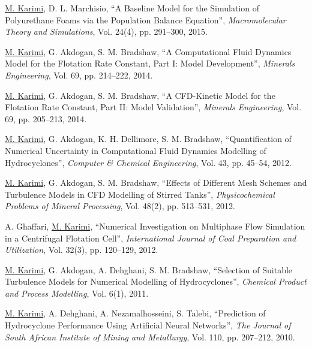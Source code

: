 \documentclass[10pt,a4]{article}
\newcounter{myEnumCounter}
\newcounter{mySaveCounter}
\renewenvironment{enumerate}{%
  \begin{list}{\arabic{myEnumCounter}.}{\usecounter{myEnumCounter}%
  \setcounter{myEnumCounter}{\value{mySaveCounter}}}
  }{%
  \setcounter{mySaveCounter}{\value{myEnumCounter}}\end{list}%
}
\newcommand{\quotes}[1]{``#1''}
\begin{document}
\begin{small}
\begin{enumerate}
	\item
\underline{M. Karimi}, D. L. Marchisio, \quotes{A Baseline Model for the Simulation of Polyurethane Foams via the Population Balance Equation}, \textit{Macromolecular Theory and Simulations}, Vol. 24(4), pp. 291--300, 2015.
	
	\item
\underline{M. Karimi}, G. Akdogan, S. M. Bradshaw, \quotes{A Computational Fluid Dynamics Model for the Flotation Rate Constant, Part I: Model Development}, \textit{Minerals Engineering}, Vol. 69, pp. 214--222, 2014.

	\item
\underline{M. Karimi}, G. Akdogan, S. M. Bradshaw, \quotes{A CFD-Kinetic Model for the Flotation Rate Constant, Part II: Model Validation}, \textit{Minerals Engineering}, Vol. 69, pp. 205--213, 2014.
	
	\item
\underline{M. Karimi}, G. Akdogan, K. H. Dellimore, S. M. Bradshaw, \quotes{Quantification of Numerical Uncertainty in Computational Fluid Dynamics Modelling of Hydrocyclones}, \textit{Computer \& Chemical Engineering}, Vol. 43, pp. 45--54, 2012. 

	\item 
\underline{M. Karimi}, G. Akdogan, S. M. Bradshaw, \quotes{Effects of Different Mesh Schemes and Turbulence Models in CFD Modelling of Stirred Tanks}, \textit{Physicochemical Problems of Mineral Processing}, Vol. 48(2), pp. 513--531, 2012.

	\item
A. Ghaffari, \underline{M. Karimi}, \quotes{Numerical Investigation on Multiphase Flow Simulation in a Centrifugal Flotation Cell}, \textit{International Journal of Coal Preparation and Utilization}, Vol. 32(3), pp. 120--129, 2012.

	\item 
\underline{M. Karimi}, G. Akdogan, A. Dehghani, S. M. Bradshaw, \quotes{Selection of Suitable Turbulence Models for Numerical Modelling of Hydrocyclones}, \textit{Chemical Product and Process Modelling}, Vol. 6(1), 2011.

	\item
\underline{M. Karimi}, A. Dehghani, A. Nezamalhosseini, S. Talebi, \quotes{Prediction of Hydrocyclone Performance Using Artificial Neural Networks}, \textit{The Journal of South African Institute of Mining and Metallurgy}, Vol. 110, pp. 207--212, 2010.

\end{enumerate}


\end{small}
\end{document}
